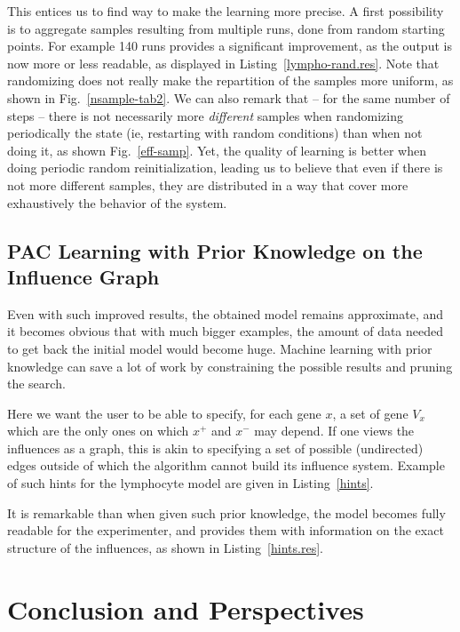 \documentclass{llncs}
\newif\ifcomments%
\newcommand{\sylvain}[1]{\ifcomments\textcolor{green}{#1}\fi}
\begin{document}
This entices us to find way to make the learning more precise. A first possibility is to aggregate samples resulting from multiple runs, done from random starting points. For example 140 runs provides a significant improvement, as the output is now more or less readable, as displayed in Listing~\ref{lympho-rand.res}. Note that randomizing does not really make the repartition of the samples more uniform, as shown in Fig.~\ref{nsample-tab2}. We can also remark that -- for the same number of steps -- there is not necessarily more \emph{different} samples when randomizing periodically the state (ie, restarting with random conditions) than when not doing it, as shown Fig.~\ref{eff-samp}. Yet, the quality of learning is better when doing periodic random reinitialization, leading us to believe that even if there is not more different samples, they are distributed in a way that cover more exhaustively the behavior of the system.

\sylvain{not sure if all this is not biased by the spurious added
activations/inhibitions. See Fig.~\ref{fig:statistics}.}

\subsection{PAC Learning with Prior Knowledge on the Influence Graph}
\label{sec:prior}

Even with such improved results, the obtained model remains approximate, and
it becomes obvious that with much bigger examples, the amount of data needed
to get back the initial model would become huge.
Machine learning with prior knowledge can save a lot of work by constraining the possible results and pruning the search.

Here we want the user to be able to specify, for each gene $x$, a set of gene $V_x$ which are the only ones on which $x^+$ and $x^-$ may depend. If one views the influences as a graph, this is akin to specifying a set of possible (undirected) edges outside of which the algorithm cannot build its influence system. Example of such hints for the lymphocyte model are given in Listing~\ref{hints}. 

It is remarkable than when given such prior knowledge, the model becomes fully readable for the experimenter, and provides them with information on the exact structure of the influences, as shown in Listing~\ref{hints.res}.




\section{Conclusion and Perspectives}
\end{document}
